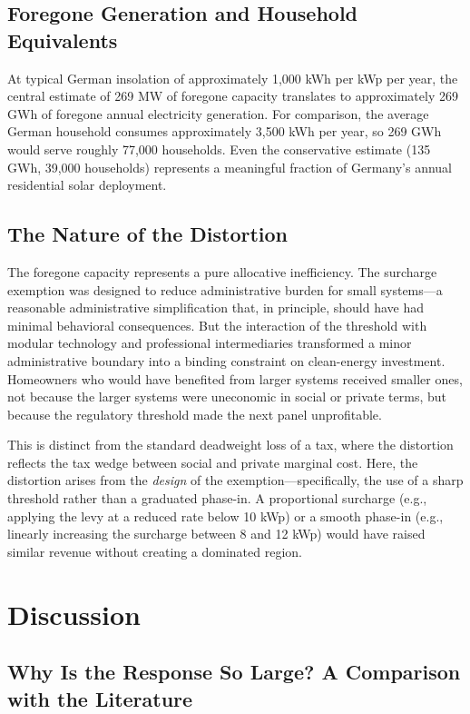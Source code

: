 \documentclass[12pt]{article}
\begin{document}
\subsection{Foregone Generation and Household Equivalents}

At typical German insolation of approximately 1,000 kWh per kWp per year, the central estimate of 269 MW of foregone capacity translates to approximately 269 GWh of foregone annual electricity generation. For comparison, the average German household consumes approximately 3,500 kWh per year, so 269 GWh would serve roughly 77,000 households. Even the conservative estimate (135 GWh, 39,000 households) represents a meaningful fraction of Germany's annual residential solar deployment.

\subsection{The Nature of the Distortion}

The foregone capacity represents a pure allocative inefficiency. The surcharge exemption was designed to reduce administrative burden for small systems---a reasonable administrative simplification that, in principle, should have had minimal behavioral consequences. But the interaction of the threshold with modular technology and professional intermediaries transformed a minor administrative boundary into a binding constraint on clean-energy investment. Homeowners who would have benefited from larger systems received smaller ones, not because the larger systems were uneconomic in social or private terms, but because the regulatory threshold made the next panel unprofitable.

This is distinct from the standard deadweight loss of a tax, where the distortion reflects the tax wedge between social and private marginal cost. Here, the distortion arises from the \textit{design} of the exemption---specifically, the use of a sharp threshold rather than a graduated phase-in. A proportional surcharge (e.g., applying the levy at a reduced rate below 10 kWp) or a smooth phase-in (e.g., linearly increasing the surcharge between 8 and 12 kWp) would have raised similar revenue without creating a dominated region.


\section{Discussion}
\label{sec:discussion}

\subsection{Why Is the Response So Large? A Comparison with the Literature}
\end{document}
